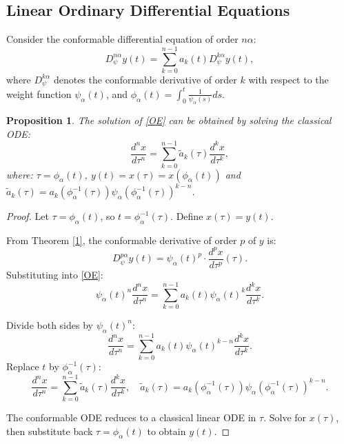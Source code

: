 \documentclass[preprint,12pt]{elsarticle}
\newtheorem{proposition}{Proposition}
\newtheorem{proof}{Proof}
\begin{document}
\subsection{Linear Ordinary Differential Equations}
Consider the conformable differential equation of order \( n\alpha \):
\begin{equation}\label{OE}
D_\psi^{n\alpha} y(t) = \sum_{k=0}^{n-1} a_k(t) D_\psi^{k\alpha} y(t),
\end{equation}
where \( D_\psi^{k\alpha} \) denotes the conformable derivative of order \( k \) with respect to the weight function \( \psi_\alpha(t) \), and \( \phi_\alpha(t) = \int_0^t \frac{1}{\psi_\alpha(s)} ds\).

\begin{proposition} The solution of \eqref{OE} can be obtained by solving the classical ODE:
\[
\frac{d^n x}{d\tau^n} = \sum_{k=0}^{n-1} \widetilde{a}_k(\tau) \frac{d^k x}{d\tau^k},
\]
where: \( \tau = \phi_\alpha(t) \),  \( y(t) = x(\tau) = x\left(\phi_\alpha(t)\right) \) and \( \widetilde{a}_k(\tau) = a_k\left(\phi_\alpha^{-1}(\tau)\right) \psi_\alpha\left(\phi_\alpha^{-1}(\tau)\right)^{k-n} \).
\end{proposition}

\begin{proof}  Let \( \tau = \phi_\alpha(t) \), so \( t = \phi_\alpha^{-1}(\tau) \). Define \( x(\tau) = y(t) \).


   From Theorem \ref{1}, the conformable derivative of order \( p \) of \( y \) is:
   \[
   D_\psi^{p\alpha} y(t) = \psi_\alpha(t)^p \cdot \frac{d^p x}{d\tau^p}(\tau).
   \]
   Substituting into \eqref{OE}:
   \[
   \psi_\alpha(t)^n \frac{d^n x}{d\tau^n} = \sum_{k=0}^{n-1} a_k(t) \psi_\alpha(t)^k \frac{d^k x}{d\tau^k}.
   \]


   Divide both sides by \( \psi_\alpha(t)^n \):
   \[
   \frac{d^n x}{d\tau^n} = \sum_{k=0}^{n-1} a_k(t) \psi_\alpha(t)^{k-n} \frac{d^k x}{d\tau^k}.
   \]
   Replace \( t \) by \( \phi_\alpha^{-1}(\tau) \):
   \[
   \frac{d^n x}{d\tau^n} = \sum_{k=0}^{n-1} \widetilde{a}_k(\tau) \frac{d^k x}{d\tau^k}, \quad \widetilde{a}_k(\tau) = a_k\left(\phi_\alpha^{-1}(\tau)\right) \psi_\alpha\left(\phi_\alpha^{-1}(\tau)\right)^{k-n}.
   \]

   The conformable ODE reduces to a classical linear ODE in \( \tau \). Solve for \( x(\tau) \), then substitute back \( \tau = \phi_\alpha(t) \) to obtain \( y(t) \).
\end{proof}
\end{document}
